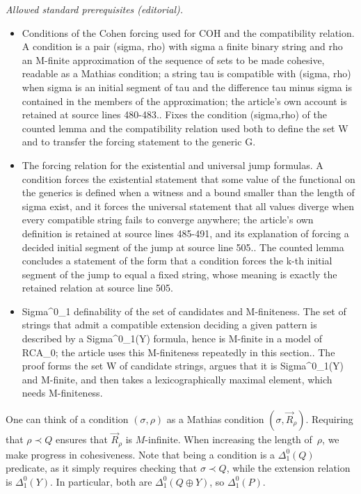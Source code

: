 \documentclass{article}
\numberwithin{theorem}{section}
\begin{document}
\noindent\textit{Allowed standard prerequisites (editorial).}\begin{itemize}
\item Conditions of the Cohen forcing used for COH and the compatibility relation. A condition is a pair (sigma, rho) with sigma a finite binary string and rho an M-finite approximation of the sequence of sets to be made cohesive, readable as a Mathias condition; a string tau is compatible with (sigma, rho) when sigma is an initial segment of tau and the difference tau minus sigma is contained in the members of the approximation; the article's own account is retained at source lines 480-483.. Fixes the condition (sigma,rho) of the counted lemma and the compatibility relation used both to define the set W and to transfer the forcing statement to the generic G.
\item The forcing relation for the existential and universal jump formulas. A condition forces the existential statement that some value of the functional on the generics is defined when a witness and a bound smaller than the length of sigma exist, and it forces the universal statement that all values diverge when every compatible string fails to converge anywhere; the article's own definition is retained at source lines 485-491, and its explanation of forcing a decided initial segment of the jump at source line 505.. The counted lemma concludes a statement of the form that a condition forces the k-th initial segment of the jump to equal a fixed string, whose meaning is exactly the retained relation at source line 505.
\item Sigma\textasciicircum{}0\_1 definability of the set of candidates and M-finiteness. The set of strings that admit a compatible extension deciding a given pattern is described by a Sigma\textasciicircum{}0\_1(Y) formula, hence is M-finite in a model of RCA\_0; the article uses this M-finiteness repeatedly in this section.. The proof forms the set W of candidate strings, argues that it is Sigma\textasciicircum{}0\_1(Y) and M-finite, and then takes a lexicographically maximal element, which needs M-finiteness.
\end{itemize}\medskip
One can think of a condition $(\sigma, \rho)$ as a Mathias condition $(\sigma, \vec{R}_\rho)$. Requiring that $\rho \prec Q$ ensures that $\vec{R}_\rho$ is $M$-infinite. When increasing the length of~$\rho$, we make progress in cohesiveness.
Note that being a condition is a $\Delta^0_1(Q)$ predicate, as it simply requires checking that $\sigma \prec Q$, while the extension relation is $\Delta^0_1(Y)$. In particular, both are $\Delta^0_1(Q \oplus Y)$, so $\Delta^0_1(P)$.
\end{document}
